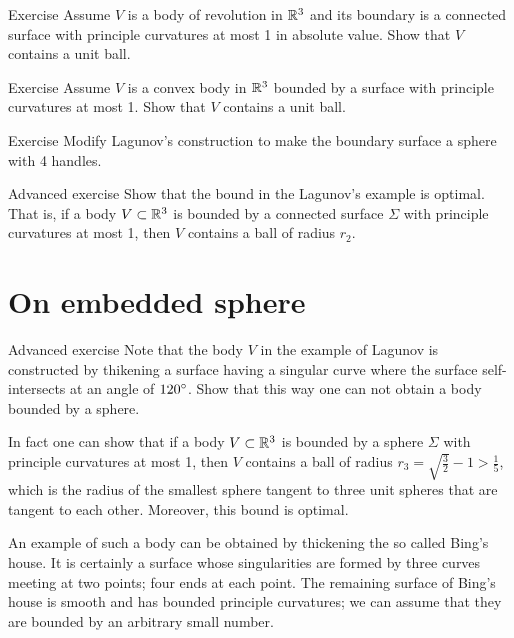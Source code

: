 \begin{thm}{Exercise}
Assume $V$ is a body of revolution in $\mathbb{R}^3$ and its boundary is a connected surface with principle curvatures at most 1 in absolute value.
Show that $V$ contains a unit ball.
\end{thm}

\begin{thm}{Exercise}\label{ex:convex-lagunov}
Assume $V$ is a convex body in $\mathbb{R}^3$ bounded by a surface with principle curvatures at most 1.
Show that $V$ contains a unit ball.
\end{thm}





\begin{thm}{Exercise}\label{ex:lagunov-genus4}
Modify Lagunov's construction to make the boundary surface a sphere with 4 handles.
\end{thm}



\begin{thm}{Advanced exercise}
Show that the bound in the Lagunov's example is optimal.
That is, if a body $V\subset \mathbb{R}^3$ is bounded by a connected surface  $\Sigma$ with principle curvatures at most 1, then $V$ contains a ball of radius $r_2$.
\end{thm}

\section*{On embedded sphere}


\begin{thm}{Advanced exercise}
Note that the body $V$ in the example of Lagunov is constructed by thikening a surface having a singular curve where the surface self-intersects at an angle of $120\degree$.
Show that this way one can not obtain a body bounded by a sphere.
\end{thm}

In fact one can show that if a body $V\subset \mathbb{R}^3$ is bounded by a sphere $\Sigma$ with principle curvatures at most 1, then $V$ contains a ball of radius $r_3=\sqrt{\tfrac32}-1>\tfrac15$,
which is the radius of the smallest sphere tangent to three unit spheres that are tangent to each other.
Moreover, this bound is optimal.

An example of such a body can be obtained by thickening the so called Bing's house.
It is certainly a surface whose singularities are formed by three curves meeting at two points;
four ends at each point.
The remaining surface of Bing's house is smooth and has bounded principle curvatures;
we can assume that they are bounded by an arbitrary small number.

